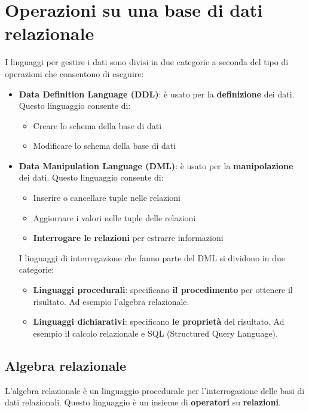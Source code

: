 \documentclass[a4paper,twoside]{article}
\begin{document}
\section{Operazioni su una base di dati relazionale}
I linguaggi per gestire i dati sono divisi in due categorie a seconda del tipo di operazioni
che consentono di eseguire:
\begin{itemize}
  \item \textbf{Data Definition Language (DDL)}: è usato per la \textbf{definizione} dei
    dati. Questo linguaggio consente di:
    \begin{itemize}
      \item Creare lo schema della base di dati
      \item Modificare lo schema della base di dati
    \end{itemize}

  \item \textbf{Data Manipulation Language (DML)}: è usato per la \textbf{manipolazione}
    dei dati. Questo linguaggio consente di:
    \begin{itemize}
      \item Inserire o cancellare tuple nelle relazioni
      \item Aggiornare i valori nelle tuple delle relazioni
      \item \textbf{Interrogare le relazioni} per estrarre informazioni
    \end{itemize}
    I linguaggi di interrogazione che fanno parte del DML si dividono in due categorie:
    \begin{itemize}
      \item \textbf{Linguaggi procedurali}: specificano \textbf{il procedimento} per
        ottenere il risultato. Ad esempio l'algebra relazionale.

      \item \textbf{Linguaggi dichiarativi}: specificano \textbf{le proprietà} del risultato.
        Ad esempio il calcolo relazionale e SQL (Structured Query Language).
    \end{itemize}
\end{itemize}

\subsection{Algebra relazionale}
L'algebra relazionale è un linguaggio procedurale per l'interrogazione delle basi di dati
relazionali. Questo linguaggio è un insieme di \textbf{operatori} su \textbf{relazioni}.
\end{document}
